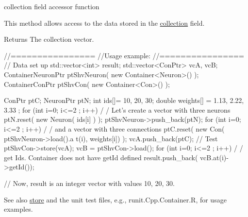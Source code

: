 collection field accessor function 

This method allows access to the data stored in the \hyperlink{class_container_a6cc12233bceb7d72709320d2c57e3398}{collection} field. \begin{DoxyReturn}{Returns}
The collection vector.
\end{DoxyReturn}

\begin{DoxyCode}
        //================
        //Usage example:
        //================
                // Data set up
                                std::vector<int> result;
                                std::vector<ConPtr> vcA, vcB;
                                ContainerNeuronPtr      ptShvNeuron( new 
      Container<Neuron>() );
                                ContainerConPtr ptShvCon( new Container<Con>() );
      
                                ConPtr  ptC;
                                NeuronPtr ptN;
                                int ids[]= {10, 20, 30};
                                double weights[] = {1.13, 2.22, 3.33 };
                                for (int i=0; i<=2 ; i++) {                             /
      / Let's create a vector with three neurons
                                        ptN.reset( new Neuron( ids[i] ) );
                                        ptShvNeuron->push_back(ptN);
                                }
                                for (int i=0; i<=2 ; i++) {                             /
      / and a vector with three connections
                                        ptC.reset( new Con( ptShvNeuron->load().a
      t(i), weights[i]) );
                                        vcA.push_back(ptC);
                                }
                // Test
                        ptShvCon->store(vcA);
                        vcB = ptShvCon->load();
                        for (int i=0; i<=2 ; i++) {                                     /
      / get Ids. Container does not have getId defined
                                        result.push_back( vcB.at(i)->getId());
                        }

                // Now, result is an integer vector with values 10, 20, 30.
\end{DoxyCode}


\begin{DoxySeeAlso}{See also}
\hyperlink{class_container_aadc7faacbf43540e46144319f7369a3e}{store} and the unit test files, e.g., runit.Cpp.Container.R, for usage examples. 
\end{DoxySeeAlso}


